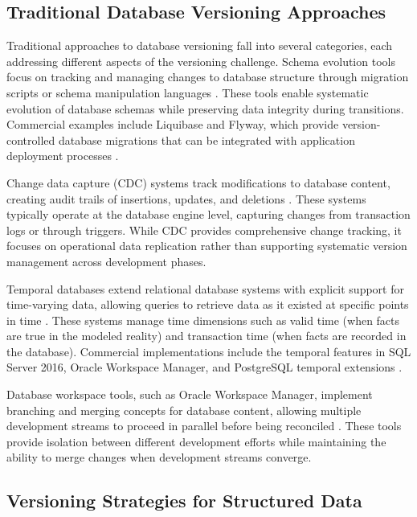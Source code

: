 \subsection{Traditional Database Versioning Approaches}
\label{subsec:traditional-database-versioning}

Traditional approaches to database versioning fall into several categories, each addressing different aspects of the versioning challenge. Schema evolution tools focus on tracking and managing changes to database structure through migration scripts or schema manipulation languages \cite{curino2009automating}. These tools enable systematic evolution of database schemas while preserving data integrity during transitions. Commercial examples include Liquibase and Flyway, which provide version-controlled database migrations that can be integrated with application deployment processes \cite{dziadosz2017liquibase, sacco2022versioning}.

Change data capture (CDC) systems track modifications to database content, creating audit trails of insertions, updates, and deletions \cite{seenivasan2023real}. These systems typically operate at the database engine level, capturing changes from transaction logs or through triggers. While CDC provides comprehensive change tracking, it focuses on operational data replication rather than supporting systematic version management across development phases.

Temporal databases extend relational database systems with explicit support for time-varying data, allowing queries to retrieve data as it existed at specific points in time \cite{kulkarni2012temporal}. These systems manage time dimensions such as valid time (when facts are true in the modeled reality) and transaction time (when facts are recorded in the database). Commercial implementations include the temporal features in SQL Server 2016, Oracle Workspace Manager, and PostgreSQL temporal extensions \cite{saracco2010matter, agarwaloracle, al2013temporal}.

Database workspace tools, such as Oracle Workspace Manager, implement branching and merging concepts for database content, allowing multiple development streams to proceed in parallel before being reconciled \cite{bhattacherjee2015principles}. These tools provide isolation between different development efforts while maintaining the ability to merge changes when development streams converge.

\subsection{Versioning Strategies for Structured Data}
\label{subsec:versioning-structured-data}

